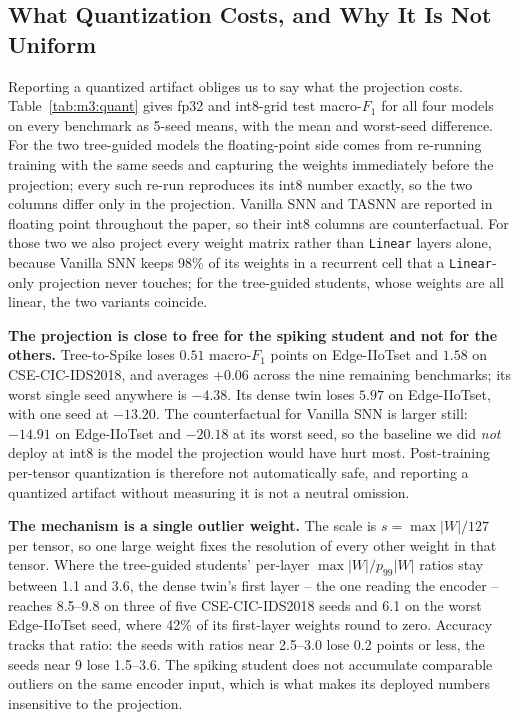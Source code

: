 
\subsection{What Quantization Costs, and Why It Is Not Uniform}
\label{subsec:quantcost}

Reporting a quantized artifact obliges us to say what the projection costs.
Table~\ref{tab:m3:quant} gives fp32 and int8-grid test macro-$F_1$ for all four
models on every benchmark as 5-seed means, with the mean and worst-seed
difference. For the two tree-guided models the floating-point side comes from
re-running training with the same seeds and capturing the weights immediately
before the projection; every such re-run reproduces its int8 number exactly, so
the two columns differ only in the projection. Vanilla SNN and TASNN are
reported in floating point throughout the paper, so their int8 columns are
counterfactual. For those two we also project every weight matrix rather than
\texttt{Linear} layers alone, because Vanilla SNN keeps 98\% of its weights in a
recurrent cell that a \texttt{Linear}-only projection never touches; for the
tree-guided students, whose weights are all linear, the two variants coincide.

\textbf{The projection is close to free for the spiking student and not for the
others.} Tree-to-Spike loses $0.51$ macro-$F_1$ points on Edge-IIoTset and
$1.58$ on CSE-CIC-IDS2018, and averages $+0.06$ across the nine remaining
benchmarks; its worst single seed anywhere is $-4.38$. Its dense twin loses
$5.97$ on Edge-IIoTset, with one seed at $-13.20$. The counterfactual for
Vanilla SNN is larger still: $-14.91$ on Edge-IIoTset and $-20.18$ at its worst
seed, so the baseline we did \emph{not} deploy at int8 is the model the
projection would have hurt most. Post-training per-tensor quantization is
therefore not automatically safe, and reporting a quantized artifact without
measuring it is not a neutral omission.

\textbf{The mechanism is a single outlier weight.} The scale is
$s = \max|W|/127$ per tensor, so one large weight fixes the resolution of every
other weight in that tensor. Where the tree-guided students' per-layer
$\max|W|/p_{99}|W|$ ratios stay between 1.1 and 3.6, the dense twin's first
layer -- the one reading the encoder -- reaches 8.5--9.8 on three of five
CSE-CIC-IDS2018 seeds and 6.1 on the worst Edge-IIoTset seed, where 42\% of its
first-layer weights round to zero. Accuracy tracks that ratio: the seeds with
ratios near 2.5--3.0 lose 0.2 points or less, the seeds near 9 lose 1.5--3.6.
The spiking student does not accumulate comparable outliers on the same encoder
input, which is what makes its deployed numbers insensitive to the projection.

